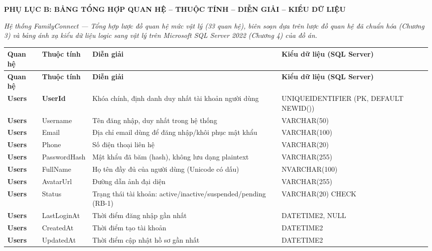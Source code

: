 
\clearpage
{}
{}
{\LARGE\bfseries PHỤ LỤC B: BẢNG TỔNG HỢP QUAN HỆ – THUỘC TÍNH – DIỄN GIẢI – KIỂU DỮ LIỆU}\par\vspace{1em}

\emph{Hệ thống FamilyConnect — Tổng hợp lược đồ quan hệ mức vật lý (33 quan hệ), biên soạn dựa trên lược đồ quan hệ đã chuẩn hóa (Chương 3) và bảng ánh xạ kiểu dữ liệu logic sang vật lý trên Microsoft SQL Server 2022 (Chương 4) của đồ án.}

\begin{longtable}{|p{}|p{}|p{}|p{}|}
\hline
\textbf{Quan hệ} & \textbf{Thuộc tính} & \textbf{Diễn giải} & \textbf{Kiểu dữ liệu (SQL Server)} \\ \hline
\endfirsthead
\hline
\textbf{Quan hệ} & \textbf{Thuộc tính} & \textbf{Diễn giải} & \textbf{Kiểu dữ liệu (SQL Server)} \\ \hline
\endhead
\textbf{Users} & \textbf{UserId} & Khóa chính, định danh duy nhất tài khoản người dùng & UNIQUEIDENTIFIER (PK, DEFAULT NEWID()) \\ \hline
\textbf{Users} & Username & Tên đăng nhập, duy nhất trong hệ thống & VARCHAR(50) \\ \hline
\textbf{Users} & Email & Địa chỉ email dùng để đăng nhập/khôi phục mật khẩu & VARCHAR(100) \\ \hline
\textbf{Users} & Phone & Số điện thoại liên hệ & VARCHAR(20) \\ \hline
\textbf{Users} & PasswordHash & Mật khẩu đã băm (hash), không lưu dạng plaintext & VARCHAR(255) \\ \hline
\textbf{Users} & FullName & Họ tên đầy đủ của người dùng (Unicode có dấu) & NVARCHAR(100) \\ \hline
\textbf{Users} & AvatarUrl & Đường dẫn ảnh đại diện & VARCHAR(255) \\ \hline
\textbf{Users} & Status & Trạng thái tài khoản: active/inactive/suspended/pending (RB-1) & VARCHAR(20) CHECK \\ \hline
\textbf{Users} & LastLoginAt & Thời điểm đăng nhập gần nhất & DATETIME2, NULL \\ \hline
\textbf{Users} & CreatedAt & Thời điểm tạo tài khoản & DATETIME2 \\ \hline
\textbf{Users} & UpdatedAt & Thời điểm cập nhật hồ sơ gần nhất & DATETIME2 \\ \hline

\end{longtable}
